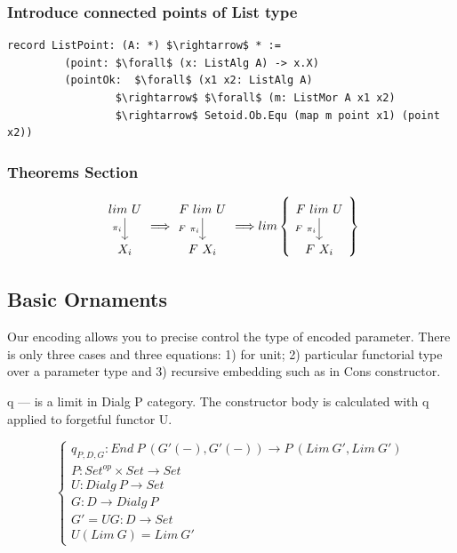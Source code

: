 \documentclass[11pt,oneside]{article}
\begin{document}
\subsubsection*{Introduce connected points of List type}

\begin{lstlisting}[mathescape=true]
  record ListPoint: (A: *) $\rightarrow$ * :=
         (point: $\forall$ (x: ListAlg A) -> x.X)
         (pointOk:  $\forall$ (x1 x2: ListAlg A)
                 $\rightarrow$ $\forall$ (m: ListMor A x1 x2)
                 $\rightarrow$ Setoid.Ob.Equ (map m point x1) (point x2))
\end{lstlisting}

\subsubsection*{Theorems Section}

\begin{center}
$$
\begin{tikzcd}
  lim\ U \arrow{d}[left]{\pi_i} \\
  X_i
\end{tikzcd}
\Longrightarrow
\begin{tikzcd}
  F\ lim\ U \arrow{d}[left]{F\ \pi_i} \\
  F\ X_i
\end{tikzcd}
\Longrightarrow
lim\left\{
\begin{tikzcd}
  F\ lim\ U \arrow{d}[left]{F\ \pi_i} \\
  F\ X_i
\end{tikzcd}
\right\}
$$
\end{center}

\subsection{Basic Ornaments}

Our encoding allows you to precise control the type of encoded parameter.
There is only three cases and three equations: 1) for unit; 2) particular
functorial type over a parameter type and 3) recursive embedding such as
in Cons constructor.

q — is a limit in Dialg P category. The constructor body is calculated
with q applied to forgetful functor U.

$$
\begin{cases}
q_{P,D,G} : End\ P\ (G'(-),G'(-)) \rightarrow P\ (Lim\ G',Lim\ G') \\
P : Set^{op} \times Set \rightarrow Set \\
U : Dialg\ P \rightarrow Set \\
G : D \rightarrow Dialg\ P \\
G' = UG : D \rightarrow Set \\
U (Lim\ G) = Lim\ G'
\end{cases}
$$
\end{document}
